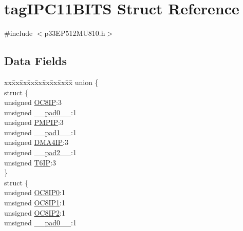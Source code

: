 \hypertarget{structtag_i_p_c11_b_i_t_s}{}\section{tag\+I\+P\+C11\+B\+I\+TS Struct Reference}
\label{structtag_i_p_c11_b_i_t_s}


{\ttfamily \#include $<$p33\+E\+P512\+M\+U810.\+h$>$}

\subsection*{Data Fields}
\begin{DoxyCompactItemize}
\item 
\begin{tabbing}
xx\=xx\=xx\=xx\=xx\=xx\=xx\=xx\=xx\=\kill
union \{\\
\>struct \{\\
\>\>unsigned \hyperlink{structtag_i_p_c11_b_i_t_s_aed98a0bf191a8f7b54c4d961eb5e6906}{OC8IP}:3\\
\>\>unsigned \hyperlink{structtag_i_p_c11_b_i_t_s_adf71f3d8410c1f1dbbc96680a92c49af}{\_\_pad0\_\_}:1\\
\>\>unsigned \hyperlink{structtag_i_p_c11_b_i_t_s_a7a0bed0de6963534bcbc71ce3698f8e7}{PMPIP}:3\\
\>\>unsigned \hyperlink{structtag_i_p_c11_b_i_t_s_acaf2d0924a107ec6e8d2e31febaf66f9}{\_\_pad1\_\_}:1\\
\>\>unsigned \hyperlink{structtag_i_p_c11_b_i_t_s_a20ca60e152121d3e91973fbff1f05643}{DMA4IP}:3\\
\>\>unsigned \hyperlink{structtag_i_p_c11_b_i_t_s_a4d97cc5f7d51d22fc2bf3eab35c9cb7f}{\_\_pad2\_\_}:1\\
\>\>unsigned \hyperlink{structtag_i_p_c11_b_i_t_s_a046912032a006d838c79c623468e8df4}{T6IP}:3\\
\>\} \\
\>struct \{\\
\>\>unsigned \hyperlink{structtag_i_p_c11_b_i_t_s_a2eba43cd6c505f92bb48f4147c353da9}{OC8IP0}:1\\
\>\>unsigned \hyperlink{structtag_i_p_c11_b_i_t_s_abdd19cd36209f2b8002a0f844ef98d74}{OC8IP1}:1\\
\>\>unsigned \hyperlink{structtag_i_p_c11_b_i_t_s_ace4bf0cca3edb1112c6d9ba18e64ab02}{OC8IP2}:1\\
\>\>unsigned \hyperlink{structtag_i_p_c11_b_i_t_s_adf71f3d8410c1f1dbbc96680a92c49af}{\_\_pad0\_\_}:1\\

\end{tabbing}
\end{DoxyCompactItemize}

